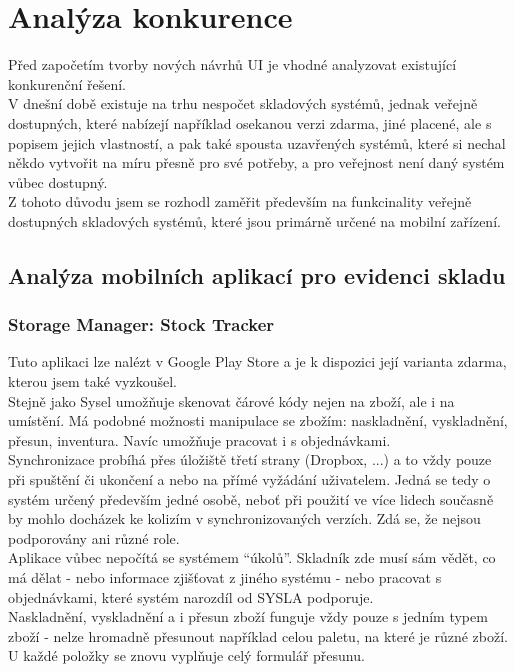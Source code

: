 
\section{Analýza konkurence}

Před započetím tvorby nových návrhů UI je vhodné analyzovat existující konkurenční řešení.\\
V dnešní době existuje na trhu nespočet skladových systémů, jednak veřejně dostupných, které nabízejí například osekanou verzi zdarma, jiné placené, ale s popisem jejich vlastností, a pak také spousta uzavřených systémů, které si nechal někdo vytvořit na míru přesně pro své potřeby, a pro veřejnost není daný systém vůbec dostupný.\\
Z tohoto důvodu jsem se rozhodl zaměřit především na funkcinality veřejně dostupných skladových systémů, které jsou primárně určené na mobilní zařízení.\\

\subsection{Analýza mobilních aplikací pro evidenci skladu}

\subsubsection{Storage Manager: Stock Tracker}

Tuto aplikaci lze nalézt v Google Play Store a je k dispozici její varianta zdarma, kterou jsem také vyzkoušel.\\
Stejně jako Sysel umožňuje skenovat čárové kódy nejen na zboží, ale i na umístění. Má podobné možnosti manipulace se zbožím: naskladnění, vyskladnění, přesun, inventura. Navíc umožňuje pracovat i s objednávkami.\\
Synchronizace probíhá přes úložiště třetí strany (Dropbox, ...) a to vždy pouze při spuštění či ukončení a nebo na přímé vyžádání uživatelem. Jedná se tedy o systém určený především jedné osobě, neboť při použití ve více lidech současně by mohlo docházek ke kolizím v synchronizovaných verzích. Zdá se, že nejsou podporovány ani různé role.\\
Aplikace vůbec nepočítá se systémem “úkolů”. Skladník zde musí sám vědět, co má dělat - nebo informace zjišťovat z jiného systému - nebo pracovat s objednávkami, které systém narozdíl od SYSLA podporuje.\\
Naskladnění, vyskladnění a i přesun zboží funguje vždy pouze s jedním typem zboží - nelze hromadně přesunout například celou paletu, na které je různé zboží. U každé položky se znovu vyplňuje celý formulář přesunu.\\


